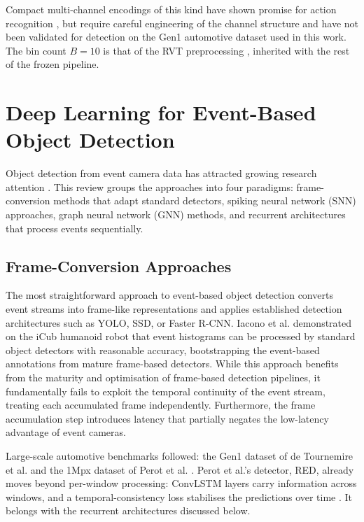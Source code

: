 \documentclass[11pt, a4paper]{report}
\begin{document}
Compact multi-channel encodings of this kind have shown promise for action recognition \cite{innocenti2021temporal}, but require careful engineering of the channel structure and have not been validated for detection on the Gen1 automotive dataset used in this work. The bin count $B = 10$ is that of the RVT preprocessing \cite{gehrig2023recurrent}, inherited with the rest of the frozen pipeline. 

\section{Deep Learning for Event-Based Object Detection}
Object detection from event camera data has attracted growing research attention \cite{zheng2023deep}. This review groups the approaches into four paradigms: frame-conversion methods that adapt standard detectors, spiking neural network (SNN) approaches, graph neural network (GNN) methods, and recurrent architectures that process events sequentially. 

\subsection{Frame-Conversion Approaches}
The most straightforward approach to event-based object detection converts event streams into frame-like representations and applies established detection architectures such as YOLO, SSD, or Faster R-CNN. Iacono et al. \cite{iacono2018towards} demonstrated on the iCub humanoid robot that event histograms can be processed by standard object detectors with reasonable accuracy, bootstrapping the event-based annotations from mature frame-based detectors. While this approach benefits from the maturity and optimisation of frame-based detection pipelines, it fundamentally fails to exploit the temporal continuity of the event stream, treating each accumulated frame independently. Furthermore, the frame accumulation step introduces latency that partially negates the low-latency advantage of event cameras. 

Large-scale automotive benchmarks followed: the Gen1 dataset of de Tournemire et al. \cite{detournemire2020large} and the 1Mpx dataset of Perot et al. \cite{perot2020learning}. Perot et al.'s detector, RED, already moves beyond per-window processing: ConvLSTM layers carry information across windows, and a temporal-consistency loss stabilises the predictions over time \cite{perot2020learning}. It belongs with the recurrent architectures discussed below.
\end{document}
